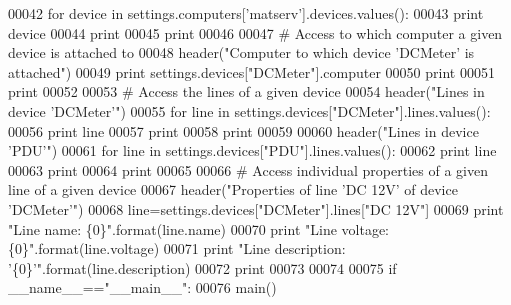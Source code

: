 \begin{DoxyCode}
00042     \textcolor{keywordflow}{for} device \textcolor{keywordflow}{in} settings.computers[\textcolor{stringliteral}{'matserv'}].devices.values():
00043         \textcolor{keywordflow}{print} device
00044     \textcolor{keywordflow}{print}
00045     \textcolor{keywordflow}{print}
00046 
00047     \textcolor{comment}{# Access to which computer a given device is attached to}
00048     header(\textcolor{stringliteral}{"Computer to which device 'DCMeter' is attached"})
00049     \textcolor{keywordflow}{print} settings.devices[\textcolor{stringliteral}{"DCMeter"}].computer
00050     \textcolor{keywordflow}{print}
00051     \textcolor{keywordflow}{print}
00052 
00053     \textcolor{comment}{# Access the lines of a given device}
00054     header(\textcolor{stringliteral}{"Lines in device 'DCMeter'"})
00055     \textcolor{keywordflow}{for} line \textcolor{keywordflow}{in} settings.devices[\textcolor{stringliteral}{"DCMeter"}].lines.values():
00056         \textcolor{keywordflow}{print} line
00057     \textcolor{keywordflow}{print}
00058     \textcolor{keywordflow}{print}
00059 
00060     header(\textcolor{stringliteral}{"Lines in device 'PDU'"})
00061     \textcolor{keywordflow}{for} line \textcolor{keywordflow}{in} settings.devices[\textcolor{stringliteral}{"PDU"}].lines.values():
00062         \textcolor{keywordflow}{print} line
00063     \textcolor{keywordflow}{print}
00064     \textcolor{keywordflow}{print}
00065 
00066     \textcolor{comment}{# Access individual properties of a given line of a given device}
00067     header(\textcolor{stringliteral}{"Properties of line 'DC 12V' of device 'DCMeter'"})
00068     line=settings.devices[\textcolor{stringliteral}{"DCMeter"}].lines[\textcolor{stringliteral}{"DC 12V"}]
00069     \textcolor{keywordflow}{print} \textcolor{stringliteral}{"Line name: \{0\}"}.format(line.name)
00070     \textcolor{keywordflow}{print} \textcolor{stringliteral}{"Line voltage: \{0\}"}.format(line.voltage)
00071     \textcolor{keywordflow}{print} \textcolor{stringliteral}{"Line description: '\{0\}'"}.format(line.description)
00072     \textcolor{keywordflow}{print}
00073 
00074 
00075 \textcolor{keywordflow}{if} \_\_name\_\_==\textcolor{stringliteral}{"\_\_main\_\_"}:
00076    main()
\end{DoxyCode}
